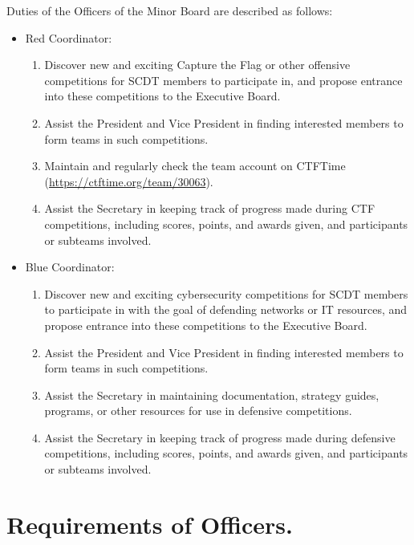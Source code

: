 \documentclass[12pt]{constitution}
\begin{document}
Duties of the Officers of the Minor Board are described as follows:

\begin{itemize}
    \item Red Coordinator:
        \begin{enumerate}
            \item Discover new and exciting Capture the Flag or other offensive
            competitions for SCDT members to participate in, and propose
            entrance into these competitions to the Executive Board.
            \item Assist the President and Vice President in finding interested
            members to form teams in such competitions.
            \item Maintain and regularly check the team account on CTFTime
            (\url{https://ctftime.org/team/30063}).
            \item Assist the Secretary in keeping track of progress made during
            CTF competitions, including scores, points, and awards given, and
            participants or subteams involved.
        \end{enumerate}

    \item Blue Coordinator:
        \begin{enumerate}
            \item Discover new and exciting cybersecurity competitions for SCDT
            members to participate in with the goal of defending networks or IT
            resources, and propose entrance into these competitions to the
            Executive Board.
            \item Assist the President and Vice President in finding interested
            members to form teams in such competitions.
            \item Assist the Secretary in maintaining documentation, strategy
            guides, programs, or other resources for use in defensive
            competitions.
            \item Assist the Secretary in keeping track of progress made during
            defensive competitions, including scores, points, and awards given,
            and participants or subteams involved. 
        \end{enumerate}
\end{itemize}

\section{Requirements of Officers.}\label{sec:REQUIREMENTS-OF-OFFICERS}
\end{document}
